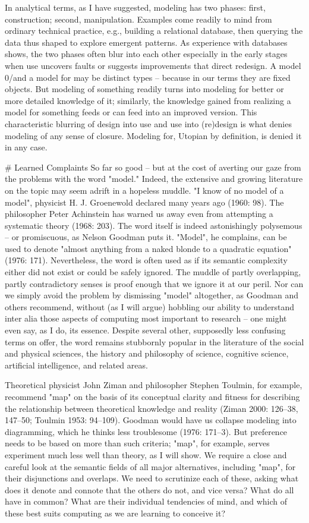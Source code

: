 In analytical terms, as I have suggested, modeling has two phases: first, construction; second, manipulation. Examples come readily to mind from ordinary technical practice, e.g., building a relational database, then querying the data thus shaped to explore emergent patterns. As experience with databases shows, the two phases often blur into each other especially in the early stages when use uncovers faults or suggests improvements that direct redesign. A model 0/and a model for may be distinct types – because in our terms they are fixed objects. But modeling of something readily turns into modeling for better or more detailed knowledge of it; similarly, the knowledge gained from realizing a model for something feeds or can feed into an improved version. This characteristic blurring of design into use and use into (re)design is what denies modeling of any sense of closure. Modeling for, Utopian by definition, is denied it in any case.

# Learned Complaints
So far so good – but at the cost of averting our gaze from the problems with the word "model." Indeed, the extensive and growing literature on the topic may seem adrift in a hopeless muddle. "I know of no model of a model", physicist H. J. Groenewold declared many years ago (1960: 98). The philosopher Peter Achinstein has warned us away even from attempting a systematic theory (1968: 203). The word itself is indeed astonishingly polysemous – or promiscuous, as Nelson Goodman puts it. "Model", he complains, can be used to denote "almost anything from a naked blonde to a quadratic equation" (1976: 171). Nevertheless, the word is often used as if its semantic complexity either did not exist or could be safely ignored. The muddle of partly overlapping, partly contradictory senses is proof enough that we ignore it at our peril. Nor can we simply avoid the problem by dismissing "model" altogether, as Goodman and others recommend, without (as I will argue) hobbling our ability to understand inter alia those aspects of computing most important to research – one might even say, as I do, its essence. Despite several other, supposedly less confusing terms on offer, the word remains stubbornly popular in the literature of the social and physical sciences, the history and philosophy of science, cognitive science, artificial intelligence, and related areas.

Theoretical physicist John Ziman and philosopher Stephen Toulmin, for example, recommend "map" on the basis of its conceptual clarity and fitness for describing the relationship between theoretical knowledge and reality (Ziman 2000: 126–38, 147–50; Toulmin 1953: 94–109). Goodman would have us collapse modeling into diagramming, which he thinks less troublesome (1976: 171–3). But preference needs to be based on more than such criteria; "map", for example, serves experiment much less well than theory, as I will show. We require a close and careful look at the semantic fields of all major alternatives, including "map", for their disjunctions and overlaps. We need to scrutinize each of these, asking what does it denote and connote that the others do not, and vice versa? What do all have in common? What are their individual tendencies of mind, and which of these best suits computing as we are learning to conceive it?

